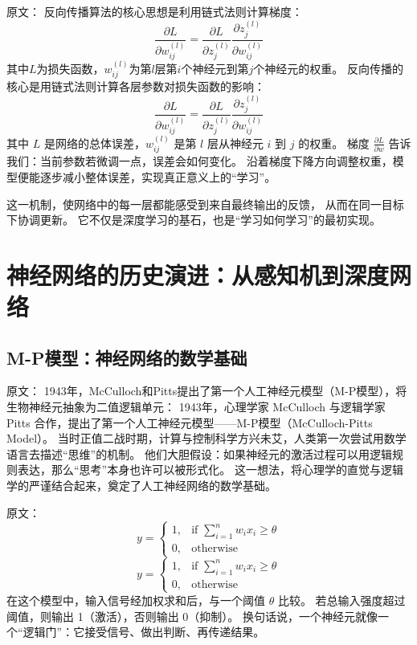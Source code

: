 原文：
反向传播算法的核心思想是利用链式法则计算梯度：
\begin{equation}
\frac{\partial L}{\partial w_{ij}^{(l)}} = \frac{\partial L}{\partial z_j^{(l)}} \frac{\partial z_j^{(l)}}{\partial w_{ij}^{(l)}}
\end{equation}
其中$L$为损失函数，$w_{ij}^{(l)}$为第$l$层第$i$个神经元到第$j$个神经元的权重。
反向传播的核心是用链式法则计算各层参数对损失函数的影响：  
\begin{equation}
\frac{\partial L}{\partial w_{ij}^{(l)}} = \frac{\partial L}{\partial z_j^{(l)}} \frac{\partial z_j^{(l)}}{\partial w_{ij}^{(l)}}
\end{equation}
其中 $L$ 是网络的总体误差，$w_{ij}^{(l)}$ 是第 $l$ 层从神经元 $i$ 到 $j$ 的权重。  
梯度 $\frac{\partial L}{\partial w}$ 告诉我们：当前参数若微调一点，误差会如何变化。  
沿着梯度下降方向调整权重，模型便能逐步减小整体误差，实现真正意义上的“学习”。  

这一机制，使网络中的每一层都能感受到来自最终输出的反馈，  
从而在同一目标下协调更新。  
它不仅是深度学习的基石，也是“学习如何学习”的最初实现。


\section{神经网络的历史演进：从感知机到深度网络}

\subsection{M-P模型：神经网络的数学基础}

原文：
1943年，McCulloch和Pitts提出了第一个人工神经元模型（M-P模型），将生物神经元抽象为二值逻辑单元：
1943年，心理学家 McCulloch 与逻辑学家 Pitts 合作，提出了第一个人工神经元模型——M-P模型（McCulloch-Pitts Model）。  
当时正值二战时期，计算与控制科学方兴未艾，人类第一次尝试用数学语言去描述“思维”的机制。  
他们大胆假设：如果神经元的激活过程可以用逻辑规则表达，那么“思考”本身也许可以被形式化。  
这一想法，将心理学的直觉与逻辑学的严谨结合起来，奠定了人工神经网络的数学基础。

原文：
\begin{equation}
y = \begin{cases}
1, & \text{if } \sum_{i=1}^{n} w_i x_i \geq \theta \\
0, & \text{otherwise}
\end{cases}
\end{equation}
\begin{equation}
y = 
\begin{cases}
1, & \text{if } \sum_{i=1}^{n} w_i x_i \geq \theta \\
0, & \text{otherwise}
\end{cases}
\end{equation}
在这个模型中，输入信号经加权求和后，与一个阈值 $\theta$ 比较。  
若总输入强度超过阈值，则输出 1（激活），否则输出 0（抑制）。  
换句话说，一个神经元就像一个“逻辑门”：它接受信号、做出判断、再传递结果。

